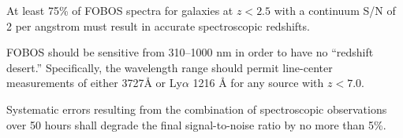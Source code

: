 \documentclass[11pt,a4paper,twoside,onecolumn,openany,final,oldfontcommands]{memoir}
\begin{document}
\medskip
\begin{sciencerequirement}
\reqitem At least 75\% of FOBOS spectra for galaxies at $z<2.5$ with a continuum S/N of 2 per angstrom must result in accurate spectroscopic redshifts. \label{prog:photoz:zcomplete}

\reqitem FOBOS should be sensitive from 310--1000 nm in order to have no ``redshift desert.''  Specifically, the wavelength range should permit line-center measurements of either  3727\AA{} or Ly$\alpha$ 1216 \AA{} for any source with $z < 7.0$.  

\reqitem Systematic errors resulting from the combination of spectroscopic observations over 50 hours shall degrade the final signal-to-noise ratio by no more than 5\%.  

\end{sciencerequirement}




\end{document}
